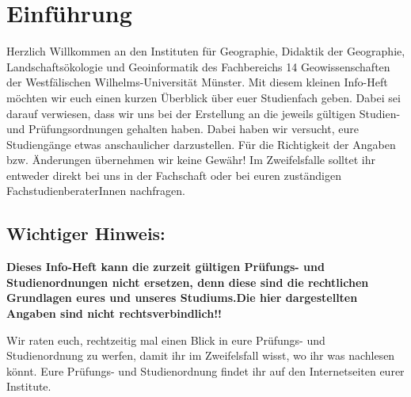 \chapter{Einführung}
Herzlich Willkommen an den Instituten für Geographie, Didaktik der Geographie, Landschaftsökologie und Geoinformatik des Fachbereichs 14 Geowissenschaften der Westfälischen Wilhelms-Universität Münster. Mit diesem kleinen Info-Heft möchten wir euch einen kurzen Überblick über euer Studienfach geben. Dabei sei darauf verwiesen, dass wir uns bei der Erstellung an die jeweils gültigen Studien- und Prüfungsordnungen gehalten haben. Dabei haben wir versucht, eure Studiengänge etwas anschaulicher darzustellen. Für die Richtigkeit der Angaben bzw. Änderungen übernehmen wir keine Gewähr! Im Zweifelsfalle solltet ihr entweder direkt bei uns in der Fachschaft oder bei euren zuständigen FachstudienberaterInnen nachfragen.

\section*{Wichtiger Hinweis:}
\textbf{Dieses Info-Heft kann die zurzeit gültigen Prüfungs- und Studienordnungen nicht ersetzen, denn diese sind die rechtlichen Grundlagen eures und unseres Studiums.\newline Die hier dargestellten Angaben sind nicht rechtsverbindlich!!}

Wir raten euch, rechtzeitig mal einen Blick in eure Prüfungs- und Studienordnung zu werfen, damit ihr im Zweifelsfall wisst, wo ihr was nachlesen könnt. Eure Prüfungs- und Studienordnung findet ihr auf den Internetseiten eurer Institute.

